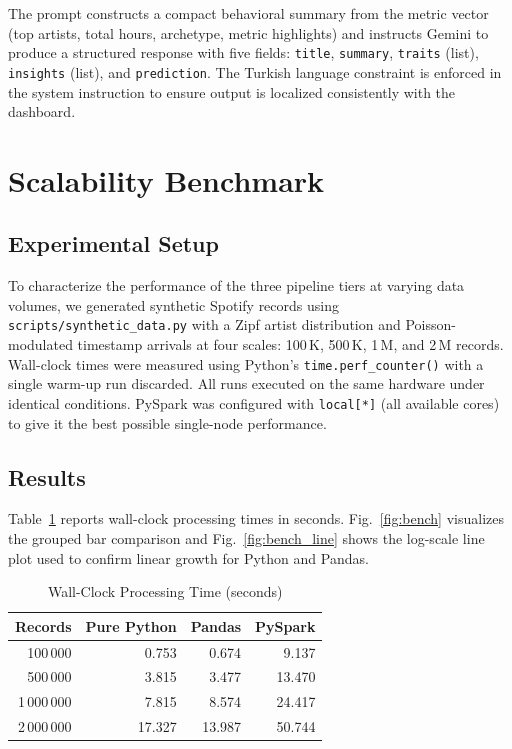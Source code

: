 \documentclass[conference]{IEEEtran}
\begin{document}
The prompt constructs a compact behavioral summary from the metric vector
(top artists, total hours, archetype, metric highlights) and instructs
Gemini to produce a structured response with five fields: \texttt{title},
\texttt{summary}, \texttt{traits} (list), \texttt{insights} (list), and
\texttt{prediction}. The Turkish language constraint is enforced in the
system instruction to ensure output is localized consistently with the
dashboard.

\section{Scalability Benchmark}

\subsection{Experimental Setup}

To characterize the performance of the three pipeline tiers at varying data
volumes, we generated synthetic Spotify records using
\texttt{scripts/synthetic\_data.py} with a Zipf artist distribution and
Poisson-modulated timestamp arrivals at four scales: 100\,K, 500\,K, 1\,M,
and 2\,M records. Wall-clock times were measured using Python's
\texttt{time.perf\_counter()} with a single warm-up run discarded.
All runs executed on the same hardware under identical conditions.
PySpark was configured with \texttt{local[*]} (all available cores) to give
it the best possible single-node performance.

\subsection{Results}

Table~\ref{tab:bench} reports wall-clock processing times in seconds.
Fig.~\ref{fig:bench} visualizes the grouped bar comparison and
Fig.~\ref{fig:bench_line} shows the log-scale line plot used to
confirm linear growth for Python and Pandas.

\begin{table}[ht]
\caption{Wall-Clock Processing Time (seconds)}
\label{tab:bench}
\centering
\begin{tabular}{rrrr}
\toprule
\textbf{Records} & \textbf{Pure Python} & \textbf{Pandas} & \textbf{PySpark} \\
\midrule
100\,000    & 0.753  & 0.674  & 9.137  \\
500\,000    & 3.815  & 3.477  & 13.470 \\
1\,000\,000 & 7.815  & 8.574  & 24.417 \\
2\,000\,000 & 17.327 & 13.987 & 50.744 \\
\bottomrule
\end{tabular}
\end{table}
\end{document}
